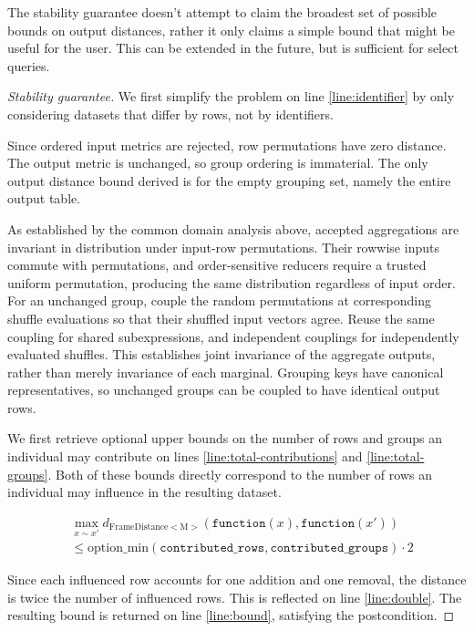 \documentclass{article}
\begin{document}
The stability guarantee doesn't attempt to claim the broadest set of possible bounds on output distances,
rather it only claims a simple bound that might be useful for the user.
This can be extended in the future, but is sufficient for select queries.

\begin{proof}[Stability guarantee]
    We first simplify the problem on line \ref{line:identifier} by only considering datasets that differ by rows, not by identifiers.

    Since ordered input metrics are rejected, row permutations have zero
    distance. The output metric is unchanged, so group ordering is immaterial.
    The only output distance bound derived is for the empty grouping set, namely the entire output table.

    As established by the common domain analysis above, accepted aggregations are invariant
    in distribution under input-row permutations. Their rowwise inputs commute
    with permutations, and order-sensitive reducers require a trusted uniform
    permutation, producing the same distribution regardless of input order.
    For an unchanged group, couple the random permutations at corresponding
    shuffle evaluations so that their shuffled input vectors agree.
    Reuse the same coupling for shared subexpressions, and independent couplings
    for independently evaluated shuffles. This establishes joint invariance of
    the aggregate outputs, rather than merely invariance of each marginal.
    Grouping keys have canonical representatives, so unchanged groups can be
    coupled to have identical output rows.

    We first retrieve optional upper bounds on the number of rows and groups an individual may contribute on lines \ref{line:total-contributions} and \ref{line:total-groups}.
    Both of these bounds directly correspond to the number of rows an individual may influence in the resulting dataset.

    \begin{align}
        &\max_{x \sim x'} d_{\mathrm{FrameDistance<M>}}(\texttt{function}(x), \texttt{function}(x')) \\
        &\le \mathrm{option\_min}(\texttt{contributed\_rows}, \texttt{contributed\_groups}) \cdot 2
    \end{align}

    Since each influenced row accounts for one addition and one removal, the distance is twice the number of influenced rows.
    This is reflected on line \ref{line:double}.
    The resulting bound is returned on line \ref{line:bound}, satisfying the postcondition.
\end{proof}
\end{document}
